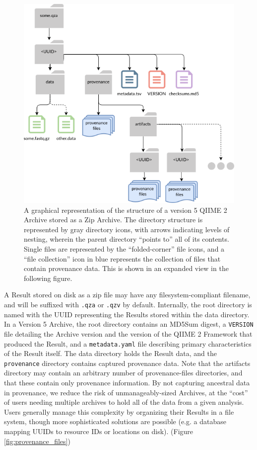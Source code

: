 \begin{figure}[htbp]
\centering
\includegraphics[width=\textwidth]{figures/archive_structure.png}
\caption[Diagram of the structure of a version-5 QIIME 2 Archive]%
{A graphical representation of the structure of a version 5 QIIME 2 Archive
stored as a Zip Archive. The directory structure is represented by gray
directory icons, with arrows indicating levels of nesting, wherein the parent
directory “points to” all of its contents. Single files are represented by the
“folded-corner” file icons, and a “file collection” icon in blue represents the
collection of files that contain provenance data. This is shown in an expanded
view in the following figure.}
\label{fig:archive_structure}
\end{figure}
A Result stored on disk as a zip file may have any filesystem-compliant
filename, and will be suffixed with \texttt{.qza} or \texttt{.qzv} by default. Internally, the
root directory is named with the UUID representing the Results stored within the
data directory. In a Version 5 Archive, the root directory contains an MD5Sum
digest, a \texttt{VERSION} file detailing the Archive version and the version of the
QIIME 2 Framework that produced the Result, and a \texttt{metadata.yaml} file describing
primary characteristics of the Result itself. The data directory holds the
Result data, and the \texttt{provenance} directory contains captured provenance data.
Note that the artifacts directory may contain an arbitrary number of
provenance-files directories, and that these contain only provenance
information. By not capturing ancestral data in provenance, we reduce the risk
of unmanageably-sized Archives, at the “cost” of users needing multiple archives
to hold all of the data from a given analysis. Users generally manage this
complexity by organizing their Results in a file system, though more
sophisticated solutions are possible (e.g. a database mapping UUIDs to resource
IDs or locations on disk). (Figure \ref{fig:provenance_files})

